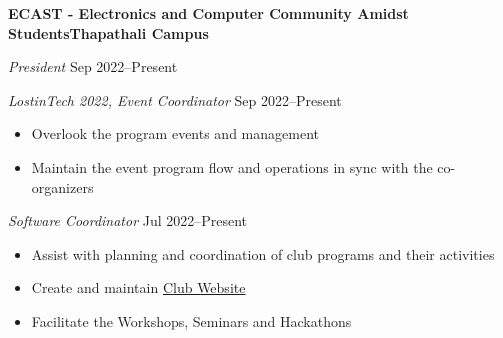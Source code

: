 \textbf{ECAST - Electronics and Computer Community Amidst Students\hfill Thapathali Campus}\par

\textit{President} \hfill Sep 2022--Present

\textit{LostinTech 2022, Event Coordinator} \hfill Sep 2022--Present
\begin{itemize}
	\item Overlook the program events and management
	\item Maintain the event program flow and operations in sync with the co-organizers
\end{itemize}\par

\textit{Software Coordinator} \hfill Jul 2022--Present
\begin{itemize}
	\item Assist with planning and coordination of club programs and their activities
	\item Create and maintain \href{https://www.ecast.tech/}{Club Website}
	\item Facilitate the Workshops, Seminars and Hackathons
\end{itemize}\par